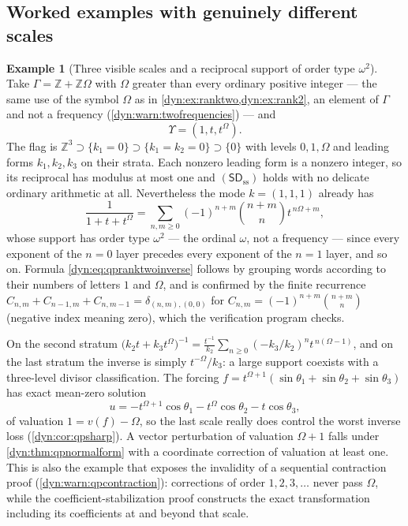 \documentclass[11pt,letterpaper]{article}
\theoremstyle{definition}
\newtheorem{example}[example]{Example}
\theoremstyle{remark}
\newcommand{\Z}{\mathbb Z}
\newcommand{\sdss}{\mathsf{SD}_{\mathrm{ss}}}
\numberwithin{equation}{section}
\begin{document}
\subsection{Worked examples with genuinely different scales}
\label{dyn:subsec:qpexamples}

\begin{example}[Three visible scales and a reciprocal support of order type
$\omega^{2}$]\label{dyn:ex:qpthree}
Take $\Gamma=\Z+\Z\Omega$ with $\Omega$ greater than every ordinary
positive integer --- the same use of the symbol $\Omega$ as in
\cref{dyn:ex:ranktwo,dyn:ex:rank2}, an element of $\Gamma$ and not a
frequency (\cref{dyn:warn:twofrequencies}) --- and
\begin{equation}\label{dyn:eq:qpthreefreq}
 \Upsilon=(1,t,t^{\Omega}).
\end{equation}
The flag is $\Z^{3}\supset\{k_1=0\}\supset\{k_1=k_2=0\}\supset\{0\}$ with
levels $0,1,\Omega$ and leading forms $k_1,k_2,k_3$ on their strata. Each
nonzero leading form is a nonzero integer, so its reciprocal has modulus at
most one and $(\sdss)$ holds with no delicate ordinary arithmetic at all.
Nevertheless the mode $k=(1,1,1)$ already has
\begin{equation}\label{dyn:eq:qpranktwoinverse}
 \frac1{1+t+t^{\Omega}}
 =\sum_{n,m\ge0}(-1)^{n+m}\binom{n+m}{n}t^{\,n\Omega+m},
\end{equation}
whose support has order type $\omega^{2}$ --- the ordinal $\omega$, not a
frequency --- since every exponent of the $n=0$ layer precedes every
exponent of the $n=1$ layer, and so on. Formula
\eqref{dyn:eq:qpranktwoinverse} follows by grouping words according to
their numbers of letters $1$ and $\Omega$, and is confirmed by the finite
recurrence $C_{n,m}+C_{n-1,m}+C_{n,m-1}=\delta_{(n,m),(0,0)}$ for
$C_{n,m}=(-1)^{n+m}\binom{n+m}{n}$ (negative index meaning zero), which the
verification program checks.

On the second stratum
$\bigl(k_2t+k_3t^{\Omega}\bigr)^{-1}
 =\frac{t^{-1}}{k_2}\sum_{n\ge0}(-k_3/k_2)^{n}t^{\,n(\Omega-1)}$, and on
the last stratum the inverse is simply $t^{-\Omega}/k_3$: a large support
coexists with a three-level divisor classification. The forcing
$f=t^{\Omega+1}(\sin\theta_1+\sin\theta_2+\sin\theta_3)$ has exact
mean-zero solution
\begin{equation}\label{dyn:eq:qpthreesolution}
 u=-t^{\Omega+1}\cos\theta_1-t^{\Omega}\cos\theta_2-t\cos\theta_3 ,
\end{equation}
of valuation $1=v(f)-\Omega$, so the last scale really does control the
worst inverse loss (\cref{dyn:cor:qpsharp}). A vector perturbation of
valuation $\Omega+1$ falls under \cref{dyn:thm:qpnormalform} with a
coordinate correction of valuation at least one. This is also the example
that exposes the invalidity of a sequential contraction proof
(\cref{dyn:warn:qpcontraction}): corrections of order $1,2,3,\dots$ never
pass $\Omega$, while the coefficient-stabilization proof constructs the
exact transformation including its coefficients at and beyond that scale.
\end{example}
\end{document}
